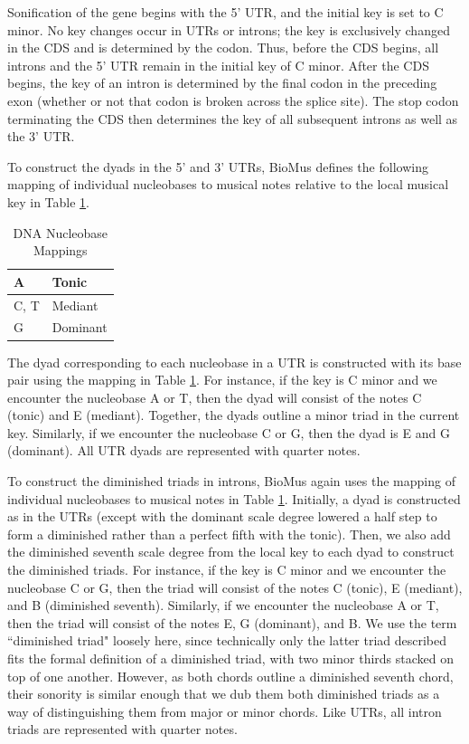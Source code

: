 \documentclass[letterpaper]{article}
\begin{document}
Sonification of the gene begins with the 5' UTR, and the initial key is set to C minor. No key changes occur in UTRs or introns; the key is exclusively changed in the CDS and is determined by the codon. Thus, before the CDS begins, all introns and the 5' UTR remain in the initial key of C minor. After the CDS begins, the key of an intron is determined by the final codon in the preceding exon (whether or not that codon is broken across the splice site). The stop codon terminating the CDS then determines the key of all subsequent introns as well as the 3' UTR.

To construct the dyads in the 5' and 3' UTRs, BioMus defines the following mapping of individual nucleobases to musical notes relative to the local musical key in Table  \ref{table:nucleobases}.

\begin{table}[h!]
\centering
\begin{tabular}{|l|l|}
\hline
A   & Tonic    \\ \hline
C, T & Mediant  \\ \hline
G   & Dominant \\ \hline
\end{tabular}
\caption{DNA Nucleobase Mappings}
\label{table:nucleobases}
\end{table}

The dyad corresponding to each nucleobase in a UTR is constructed with its base pair using the mapping in Table  \ref{table:nucleobases}. For instance, if the key is C minor and we encounter the nucleobase A or T, then the dyad will consist of the notes C (tonic) and E\musFlat \; (mediant). Together, the dyads outline a minor triad in the current key. Similarly, if we encounter the nucleobase C or G, then the dyad is E\musFlat \; and G (dominant). All UTR dyads are represented with quarter notes.

To construct the diminished triads in introns, BioMus again uses the mapping of individual nucleobases to musical notes in Table  \ref{table:nucleobases}. Initially, a dyad is constructed as in the UTRs (except with the dominant scale degree lowered a half step to form a diminished rather than a perfect fifth with the tonic). Then, we also add the diminished seventh scale degree from the local key to each dyad to construct the diminished triads. For instance, if the key is C minor and we encounter the nucleobase C or G, then the triad will consist of the notes C (tonic), E\musFlat \; (mediant), and B\musDoubleFlat\; (diminished seventh). Similarly, if we encounter the nucleobase A or T, then the triad will consist of the notes E\musFlat, G\musFlat \; (dominant), and B\musDoubleFlat. We use the term ``diminished triad" loosely here, since technically only the latter triad described fits the formal definition of a diminished triad, with two minor thirds stacked on top of one another. However, as both chords outline a diminished seventh chord, their sonority is similar enough that we dub them both diminished triads as a way of distinguishing them from major or minor chords. Like UTRs, all intron triads are represented with quarter notes. 
\end{document}
